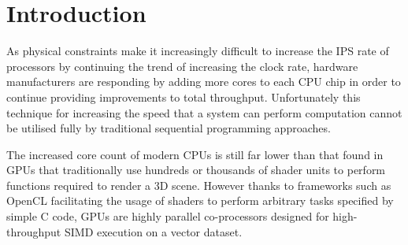 \section{Introduction}
  As physical constraints make it increasingly difficult to increase the \ac{IPS} rate of processors by continuing the trend of increasing the clock rate, hardware manufacturers are responding by adding more cores to each \ac{CPU} chip in order to continue providing improvements to total throughput. Unfortunately this technique for increasing the speed that a system can perform computation cannot be utilised fully by traditional sequential programming approaches.

  The increased core count of modern CPUs is still far lower than that found in \ac{GPUs} that traditionally use hundreds or thousands of shader units to perform functions required to render a 3D scene. However thanks to frameworks such as \ac{OpenCL} facilitating the usage of shaders to perform arbitrary tasks specified by simple C code, \ac{GPUs} are highly parallel co-processors designed for high-throughput \ac{SIMD} execution on a vector dataset.


